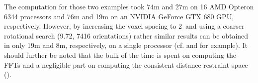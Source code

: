The computation for those two examples took 74m and 27m on 16 AMD Opteron 6344
processors and 76m and 19m on an NVIDIA GeForce GTX 680 GPU, respectively.
However, by increasing the voxel spacing to 2\Angstrom\ and using a coarser
rotational search (9.72\Deg, 7416 orientations) rather similar results can be
obtained in only 19m and 8m, respectively, on a single processor (cf.
 and
 for example). It should further be
noted that the bulk of the time is spent on computing the FFTs and a negligible
part on computing the consistent distance restraint space
().

